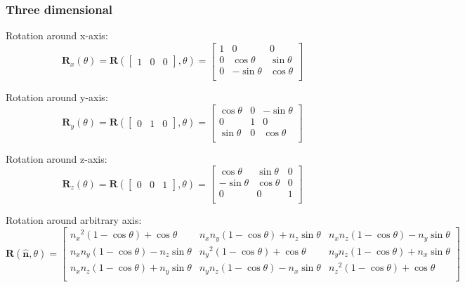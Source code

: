 \documentclass[11pt]{article}
\begin{document}
\subsubsection{Three dimensional}

Rotation around x-axis: \\
$$
\mathbf{R}_{x}(\theta) = 
\mathbf{R}(
\begin{bmatrix}
1 & 0 & 0 
\end{bmatrix},
\theta) =
 \begin{bmatrix}
1 & 0 & 0 \\
0 & {\cos\theta} & {\sin\theta} \\
0 & {- \sin\theta} & {\cos\theta} \\
\end{bmatrix}
$$

Rotation around y-axis: \\
$$
\mathbf{R}_{y}(\theta) = 
\mathbf{R}(
\begin{bmatrix}
0 & 1 & 0 
\end{bmatrix},
\theta) = \begin{bmatrix}
{\cos\theta} & 0 & {- \sin\theta} \\
0 & 1 & 0 \\
{\sin\theta} & 0 & {\cos\theta} \\
\end{bmatrix}
$$

Rotation around z-axis: \\
$$
\mathbf{R}_{z}(\theta) =
\mathbf{R}(
\begin{bmatrix}
0 & 0 & 1
\end{bmatrix},
\theta) =
\begin{bmatrix}
{\cos\theta} & {\sin\theta} & 0 \\
{- \sin\theta} & {\cos\theta} & 0 \\
0 & 0 & 1 \\
\end{bmatrix}
$$

Rotation around arbitrary axis: \\
$$
\mathbf{R}(\hat{\mathbf{n}},\theta) =
\begin{bmatrix}
{{n_{x}}^{2}\left( 1 - \cos\theta \right) + \cos\theta} & {n_{x}n_{y}\left( 1 - \cos\theta \right) + n_{z}\sin\theta} & {n_{x}n_{z}\left( 1 - \cos\theta \right) - n_{y}\sin\theta} \\
{n_{x}n_{y}\left( 1 - \cos\theta \right) - n_{z}\sin\theta} & {{n_{y}}^{2}\left( 1 - \cos\theta \right) + \cos\theta} & {n_{y}n_{z}\left( 1 - \cos\theta \right) + n_{x}\sin\theta} \\
{n_{x}n_{z}\left( 1 - \cos\theta \right) + n_{y}\sin\theta} & {n_{y}n_{z}\left( 1 - \cos\theta \right) - n_{x}\sin\theta} & {{n_{z}}^{2}\left( 1 - \cos\theta \right) + \cos\theta} \\
\end{bmatrix}
$$
\end{document}
